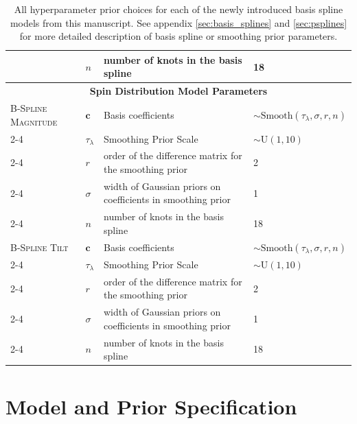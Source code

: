 \begin{table}[b!]
\begin{tabular}{|l|l|l|l|}
     & $n$ & number of knots in the basis spline & 18 \\ \hline \hline 
    \multicolumn{4}{|c|}{\textbf{Spin Distribution Model Parameters}} \\ \hline
    \textsc{B-Spline Magnitude} & $\bm{c}$ &  Basis coefficients & $\sim \mathrm{Smooth}(\tau_\lambda, \sigma, r, n)$  \\ \cline{2-4} 
    & $\tau_\lambda$ & Smoothing Prior Scale & $\sim \mathrm{U}(1,10)$ \\ \cline{2-4}
    & $r$ & order of the difference matrix for the smoothing prior & 2 \\ \cline{2-4} 
    & $\sigma$ & width of Gaussian priors on coefficients in smoothing prior & 1 \\ \cline{2-4} 
    & $n$ & number of knots in the basis spline & 18 \\ \hline \hline 
    \textsc{B-Spline Tilt} & $\bm{c}$ &  Basis coefficients & $\sim \mathrm{Smooth}(\tau_\lambda, \sigma, r, n)$  \\ \cline{2-4} 
    & $\tau_\lambda$ & Smoothing Prior Scale & $\sim \mathrm{U}(1,10)$ \\ \cline{2-4}
    & $r$ & order of the difference matrix for the smoothing prior & 2 \\ \cline{2-4} 
    & $\sigma$ & width of Gaussian priors on coefficients in smoothing prior & 1 \\ \cline{2-4} 
    & $n$ & number of knots in the basis spline & 18 \\ \hline \hline
    \end{tabular}
    \caption{All hyperparameter prior choices for each of the newly introduced basis spline models from this manuscript. See appendix 
    \ref{sec:basis_splines} and \ref{sec:psplines} for more detailed description of basis spline or smoothing prior parameters.}
    \label{tab:model_priors}
\end{table} 

\section{Model and Prior Specification} \label{sec:modelpriors}

